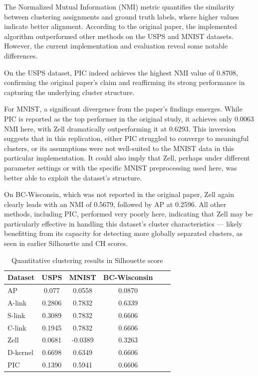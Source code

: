 \documentclass[
	10pt,
	parskip=half-,	
	paper=a4,
	english
	]{scrartcl}
\begin{document}
The Normalized Mutual Information (NMI) metric quantifies the similarity between clustering assignments and ground truth labels, where higher values indicate better alignment. According to the original paper, the implemented algorithm outperformed other methods on the USPS and MNIST datasets. However, the current implementation and evaluation reveal some notable differences.

On the USPS dataset, PIC indeed achieves the highest NMI value of 0.8708, confirming the original paper's claim and reaffirming its strong performance in capturing the underlying cluster structure. 

For MNIST, a significant divergence from the paper's findings emerges. While PIC is reported as the top performer in the original study, it achieves only 0.0063 NMI here, with Zell dramatically outperforming it at 0.6293. This inversion suggests that in this replication, either PIC struggled to converge to meaningful clusters, or its assumptions were not well-suited to the MNIST data in this particular implementation. It could also imply that Zell, perhaps under different parameter settings or with the specific MNIST preprocessing used here, was better able to exploit the dataset's structure.

On BC-Wisconsin, which was not reported in the original paper, Zell again clearly leads with an NMI of 0.5679, followed by AP at 0.2596. All other methods, including PIC, performed very poorly here, indicating that Zell may be particularly effective in handling this dataset's cluster characteristics — likely benefitting from its capacity for detecting more globally separated clusters, as seen in earlier Silhouette and CH scores.

\begin{table}[h]
    \centering
    \caption{Quantitative clustering results in Silhouette score}
    \begin{tabular}{lccccc}
    \toprule
    \textbf{Dataset} & \textbf{USPS} & \textbf{MNIST} & \textbf{BC-Wisconsin} \\
    \midrule
    AP       & 0.077   & 0.0558 & 0.0870 \\
    A-link   & 0.2806  & 0.7832 & 0.6339  \\
    S-link   & 0.3089   & 0.7832 & 0.6606 \\
    C-link   & 0.1945   & 0.7832 & 0.6606 \\
    Zell     & 0.0681   & -0.0389 & 0.3263 \\
    D-kernel & 0.6698   & 0.6349 & 0.6606 \\
    PIC      & 0.1390  & 0.5941 & 0.6606 \\
    \bottomrule
    \end{tabular}
\end{table}
\end{document}
